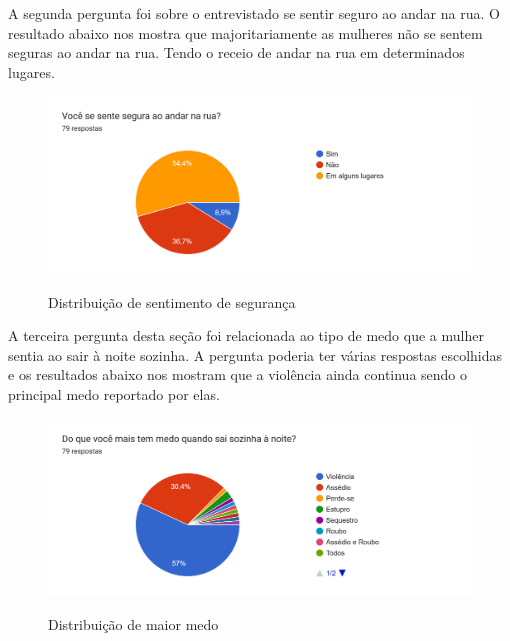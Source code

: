 A segunda pergunta foi sobre o entrevistado se sentir seguro ao andar na rua. O resultado abaixo nos mostra que majoritariamente as mulheres não se sentem seguras ao andar na rua. Tendo o receio de andar na rua em determinados lugares. 
\begin{figure}[H]
  \begin{center}
  \includegraphics[width=1.0\linewidth]{images/distribuicao-seguranca-rua.png}\\
  \end{center}
  \caption[Distribuição de sentimento de segurança]{Distribuição de sentimento de segurança}
  \label{fig:mapa-empatia=inicial}
\end{figure}

A terceira pergunta desta seção foi relacionada ao tipo de medo que a mulher sentia ao sair à noite sozinha. A pergunta poderia ter várias respostas escolhidas e os resultados abaixo nos mostram que a violência ainda continua sendo o principal medo reportado por elas.
\begin{figure}[H]
  \begin{center}
  \includegraphics[width=0.5\linewidth]{images/distribuicao-medo.png}\\
  \end{center}
  \caption[Distribuição de maior medo]{Distribuição de maior medo}
  \label{fig:mapa-empatia=inicial}
\end{figure}

